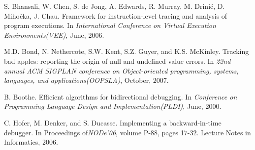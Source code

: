 \documentclass{sig-alternate}
\begin{document}
%

\begin{thebibliography}{16}


S. Bhansali, W. Chen, S. de Jong, A. Edwards, R. Murray, M. Drini\'{c}, D. Miho\v{c}ka, J. Chau. \newblock Framework for instruction-level tracing and analysis of program executions.
\newblock In \emph{International Conference on Virtual Execution Environments(VEE)},
June, 2006.

M.D. Bond, N. Nethercote, S.W. Kent, S.Z. Guyer, and K.S. McKinley. \newblock Tracking bad apples: reporting the origin of null and undefined value errors.
\newblock In \emph{22nd annual ACM SIGPLAN conference on Object-oriented programming, systems, languages, and applications(OOPSLA)},
October, 2007.


B. Boothe. \newblock Efficient algorithms for bidirectional debugging.
\newblock In \emph{Conference on Programming Language Design and Implementation(PLDI)},
June, 2000.




C. Hofer, M. Denker, and S. Ducasse. \newblock Implementing a backward-in-time debugger.
\newblock In Proceedings of\emph{NODe'06},
volume P-88, pages 17-32. Lecture Notes in Informatics, 2006.



\end{thebibliography}
\end{document}
